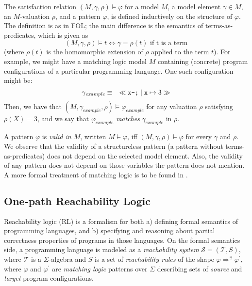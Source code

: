The satisfaction relation $(M, \gamma, \rho) \vDash \varphi$ for a model $M$, a model element $\gamma \in M$,
an $M$-valuation $\rho$, and a pattern $\varphi$, is defined inductively on the structure of $\varphi$.
The definition is as in FOL; the main difference is the semantics of
terms-as-predicates, which is given as
\begin{equation*}
    (M, \gamma, \rho) \vDash t \iff \gamma = \rho(t) \text{ if t is a term}
\end{equation*}
(where $\rho(t)$ is the homomorphic extension of $\rho$ applied to the term $t$).
For example, we might have a matching logic model $M$ containing (concrete) program configurations
of a particular programming language.
One such configuration might be:
\begin{equation*}
  \gamma_{\mathit{example}} \equiv\quad \ll\texttt{x--;}\mid \mathtt{x}\mapsto 3\gg
\end{equation*}
Then, we have that $(M, \gamma_{\mathit{example}}, \rho) \vDash \varphi_{\mathit{example}}$
for any valuation $\rho$ satisfying $\rho(X) = 3$, and we say that
$\varphi_{\mathit{example}}$ \emph{matches} $\gamma_{\mathit{example}}$ in $\rho$.


A pattern $\varphi$ is \emph{valid in $M$}, written $M \vDash \varphi$, iff $(M, \gamma, \rho) \vDash \varphi$
for every $\gamma$ and $\rho$.
We observe that the validity of a structureless pattern (a pattern without terms-as-predicates) does not depend on the selected model element.
Also, the validity of any pattern does not depend on those variables the pattern does not mention.
A more formal treatment of matching logic is to be found in .


\subsection{One-path Reachability Logic}
Reachability logic \cite{RosuS12oopsla, StefanescuCMMSR19} (RL) is a formalism for
both a) defining formal semantics of programming languages,
and b) specifying and reasoning about partial correctness properties
of programs in those languages.
On the formal semantics side, a programming language is modeled as a \emph{reachability system}
$\mathcal{S} = (\mathcal{T}, S)$, where $\mathcal{T}$ is a $\Sigma$-algebra
and $S$ is a set of \emph{reachability rules} of the shape $\varphi \Rightarrow^\exists \varphi^\prime$,
where $\varphi$ and $\varphi^\prime$ are \emph{matching logic} patterns over $\Sigma$
describing sets of \emph{source} and \emph{target} program configurations.


